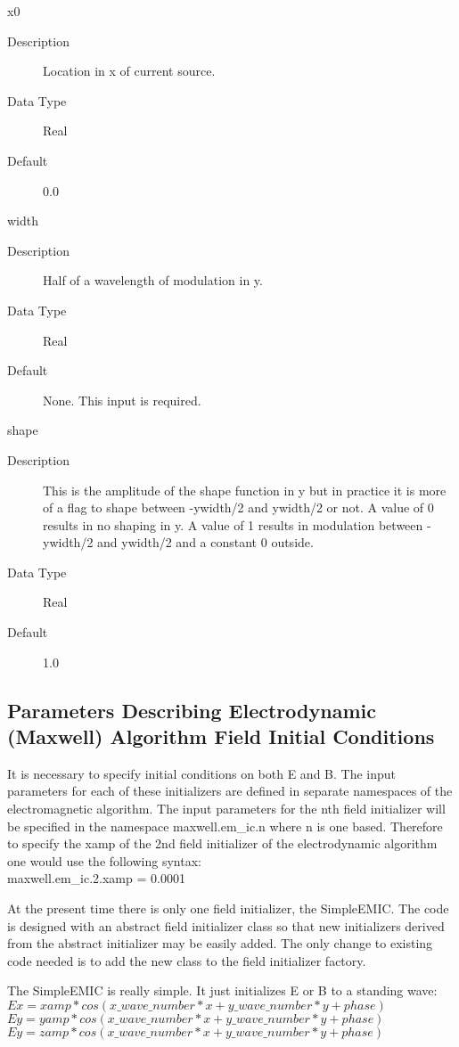 \documentclass[11pt]{amsart}
\begin{document}
x0
\begin{description}
\item [Description] Location in x of current source.
\item [Data Type] Real
\item [Default] 0.0
\end{description}

width
\begin{description}
\item [Description] Half of a wavelength of modulation in y.
\item [Data Type] Real
\item [Default] None.  This input is required.
\end{description}

shape
\begin{description}
\item [Description] This is the amplitude of the shape function in y but in
practice it is more of a flag to shape between -ywidth/2 and ywidth/2 or
not.  A value of 0 results in no shaping in y.  A value of 1 results in
modulation between -ywidth/2 and ywidth/2 and a constant 0 outside.
\item [Data Type] Real
\item [Default] 1.0
\end{description}

\subsection*{Parameters Describing Electrodynamic (Maxwell) Algorithm  Field Initial Conditions }
It is necessary to specify initial conditions on both E and B.  The input
parameters for each of these initializers are defined in separate namespaces of
the electromagnetic algorithm.  The input parameters for the nth field
initializer will be specified in the namespace maxwell.em\_ic.n where n is one
based.  Therefore to specify the xamp of the 2nd field initializer of the
electrodynamic algorithm one would use the following syntax: \\
maxwell.em\_ic.2.xamp = 0.0001

At the present time there is only one field initializer, the SimpleEMIC.  The
code is designed with an abstract field initializer class so that new
initializers derived from the abstract initializer may be easily added.  The
only change to existing code needed is to add the new class to the field
initializer factory.

The SimpleEMIC is really simple.  It just initializes E or B to a standing
wave: \\
\begin{math} Ex = xamp*cos(x\_wave\_number*x+y\_wave\_number*y+phase) \end{math} \\
\begin{math} Ey = yamp*cos(x\_wave\_number*x+y\_wave\_number*y+phase) \end{math} \\
\begin{math} Ey = zamp*cos(x\_wave\_number*x+y\_wave\_number*y+phase) \end{math}
\end{document}
